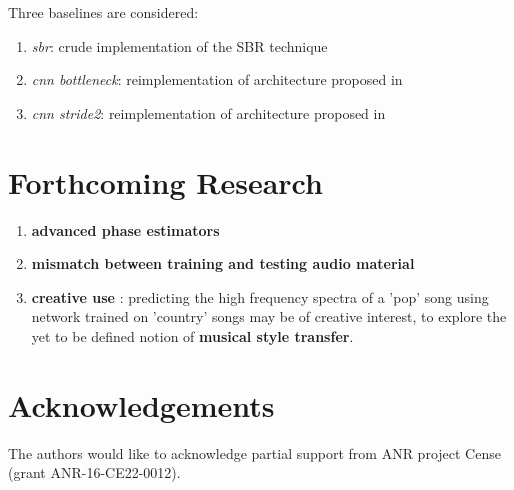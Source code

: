 \documentclass[a0,portrait,20pt]{a0poster}
\begin{document}
\begin{multicols}{2}
Three baselines are considered:
\begin{enumerate}
  \item \textit{sbr}: crude implementation of the SBR technique
  \item \textit{cnn bottleneck}: reimplementation of architecture proposed in \cite{miron2018high}
  \item \textit{cnn stride2}: reimplementation of architecture proposed in \cite{miron2018high}
\end{enumerate}

\color{SaddleBrown} %

\section*{Forthcoming Research}

\begin{enumerate}
  \item \textbf{advanced phase estimators}
  \item \textbf{mismatch between training and testing audio material}
  \item \textbf{creative use} : predicting the high frequency spectra of a 'pop' song using network trained on 'country' songs may be of creative interest, to explore the yet to be defined notion of \textbf{musical style transfer}.
\end{enumerate}


\color{DarkSlateGray}

\section*{Acknowledgements}


The authors would like to acknowledge partial support from ANR project Cense (grant ANR-16-CE22-0012).




\end{multicols}
\end{document}
